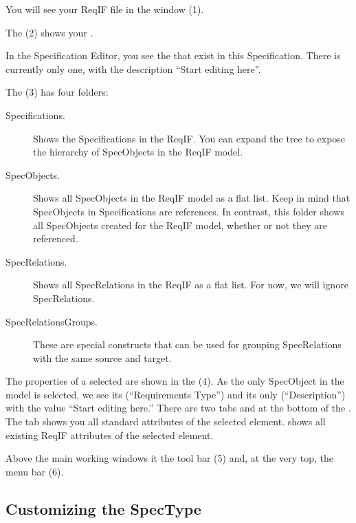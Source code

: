 You will see your ReqIF file in the  window (1).

The  (2) shows your .

In the Specification Editor, you see the  that exist in this Specification.  There is currently only one, with the description ``Start editing here''.

The  (3) has four folders:

\begin{description}
\item[Specifications.] Shows the Specifications in the ReqIF.  You can expand the tree to expose the hierarchy of SpecObjects in the ReqIF model.
\item[SpecObjects.] Shows all SpecObjects in the ReqIF model as a flat list.  Keep in mind that SpecObjects in Specifications are references.  In contrast, this folder shows all SpecObjects created for the ReqIF model, whether or not they are referenced.
\item[SpecRelations.] Shows all SpecRelations in the ReqIF as a flat list.  For now, we will ignore SpecRelations.
\item[SpecRelationsGroups.] These are special constructs that can be used for grouping SpecRelations with the same source and target.
\end{description}

The properties of a selected  are shown in the  (4).  As the only SpecObject in the model is selected, we see its  (``Requirements Type'') and its only  (``Description'') with the value ``Start editing here.''  There are two tabs  and  at the bottom of the .  The  tab shows you all standard attributes of the selected element.   shows all existing ReqIF attributes of the selected element.

Above the main working windows it the tool bar (5) and, at the very top, the menu bar (6).

\subsection{Customizing the SpecType}
\label{sec:customize-spec-type}

